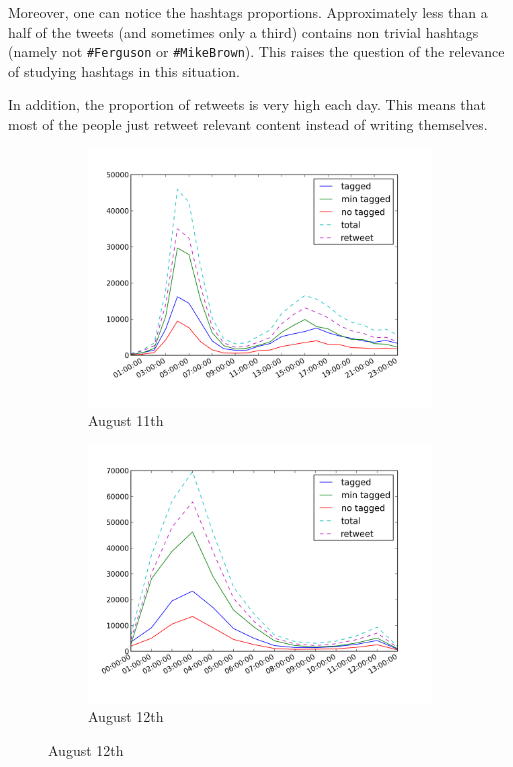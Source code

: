 \documentclass[a4paper,twoside,12pt,openright]{report}
\begin{document}
Moreover, one can notice the hashtags proportions. Approximately less than a half of the tweets (and sometimes only a third) contains non trivial hashtags (namely not \texttt{\#Ferguson} or \texttt{\#MikeBrown}). This raises the question of the relevance of studying hashtags in this situation.

In addition, the proportion of retweets is very high each day. This means that most of the people just retweet relevant content instead of writing themselves.

\begin{figure}[H]
\begin{subfigure}[t]{0.48\textwidth}
\begin{center}
	\includegraphics[width=\textwidth]{images/freqs/freq_11_08.png}
	\caption{August 11th}
\end{center}
\end{subfigure}
\hfill
\begin{subfigure}[t]{0.48\textwidth}
\begin{center}
	\includegraphics[width=\textwidth]{images/freqs/freq_12_08.png}
	\caption{August 12th}
\end{center}
\end{subfigure}


\end{figure}
\end{document}

